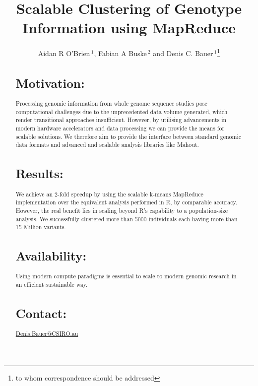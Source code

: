\documentclass{bioinfo}
\begin{document}


\newcommand{\OnePhaseone}{Phase1\_Chr1}
\newcommand{\NinteenPhaseone}{Phase1\_Chr19}
\newcommand{\SevenPhaseone}{Phase1\_Chr1-7}
\newcommand{\OnePhasethree}{Phase3\_Chr1}
\newcommand{\ThreePhasethree}{Phase3\_Chr1-3}
\newcommand{\FullPhasethree}{Phase3\_Chr1-22}

\title[MapReduce Clustering]{Scalable Clustering of Genotype Information using MapReduce}
\author[O'Brien \textit{et~al}]{Aidan R O'Brien\,$^{1}$, Fabian A Buske\,$^{2}$ and Denis C. Bauer\,$^1$\footnote{to whom correspondence should be addressed}}
\address{$^{1}$CSIRO, Digital Productivity Flagship, 11 Julius Av, 2113, Sydney, Australia\\
$^{2}$Cancer Epigenetics Program, Cancer Research Division, Kinghorn Cancer Centre, Garvan Institute of Medical Research, 384 Victoria St, 2010, Sydney, Australia}



\maketitle

\begin{abstract}

\section{Motivation:}
Processing genomic information from whole genome sequence studies pose computational challenges due to the unprecedented data volume generated, which render transitional approaches insufficient. However, by utilising advancements in modern hardware accelerators and data processing we can provide the means for scalable solutions. We therefore aim to provide the interface between standard genomic data formats and advanced and scalable analysis libraries like Mahout. 
\section{Results:}
We achieve an 2-fold speedup by using the scalable k-means MapReduce implementation over the equivalent analysis performed in R, by comparable accuracy. However, the real benefit lies in scaling beyond R's capability to a population-size analysis. We successfully clustered more than 5000 individuals each having more than 15 Million variants. 

\section{Availability:}
Using modern compute paradigms is essential to scale to modern genomic research in an efficient sustainable way. 

\section{Contact:} \href{Denis.Bauer@CSIRO.au}{Denis.Bauer@CSIRO.au}
\end{abstract}
\end{document}
